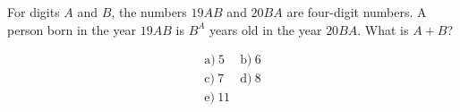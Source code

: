 For digits \(A\) and \(B\), the numbers \(19AB\) and \(20BA\) are four-digit numbers. A person born in the year \(19AB\) is \(B^A\) years old in the year \(20BA\). What is \(A+B\)?



\[
\begin{array}{ll}
\text{a)}\ 5 & \text{b)}\ 6 \\
\text{c)}\ 7 & \text{d)}\ 8 \\
\text{e)}\ 11
\end{array}
\]
